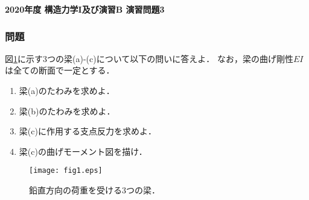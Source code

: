 \documentclass[10pt,a4j]{jarticle}
\newlength{\minitwocolumn}
\begin{document}
\newcommand{\fat}[1]{\mbox{\boldmath $#1$}}
\newcommand{\D}{\partial}
\newcommand{\w}{\omega}
\newcommand{\ga}{\alpha}
\newcommand{\gb}{\beta}
\newcommand{\gx}{\xi}
\newcommand{\gz}{\zeta}
\newcommand{\vhat}[1]{\hat{\fat{#1}}}
\newcommand{\spc}{\vspace{0.7\baselineskip}}
\newcommand{\halfspc}{\vspace{0.3\baselineskip}}

\pagestyle{empty}
\newcommand{\twofig}[2]
 {
   \begin{figure}[h]
     \begin{minipage}[t]{\minitwocolumn}
         \begin{center}   #1
         \end{center}
     \end{minipage}
         \hspace{\columnsep}
     \begin{minipage}[t]{\minitwocolumn}
         \begin{center} #2
         \end{center}
     \end{minipage}
   \end{figure}
 }
\begin{center}
{\Large \bf 2020年度 構造力学I及び演習B 演習問題3} \\
\end{center}
\subsubsection*{問題}
図\ref{fig:fig1}に示す3つの梁(a)-(c)について以下の問いに答えよ．
なお，梁の曲げ剛性$EI$は全ての断面で一定とする．
\begin{enumerate}
\item
	梁(a)のたわみを求めよ．
\item
	梁(b)のたわみを求めよ．
\item
	梁(c)に作用する支点反力を求めよ．
\item
	梁(c)の曲げモーメント図を描け．
\end{enumerate}
\begin{figure}[h]
	\begin{center}
	\texttt{[image: fig1.eps]} 
	\end{center}
	\caption{鉛直方向の荷重を受ける3つの梁．}
	\label{fig:fig1}
\end{figure}
\end{document}
